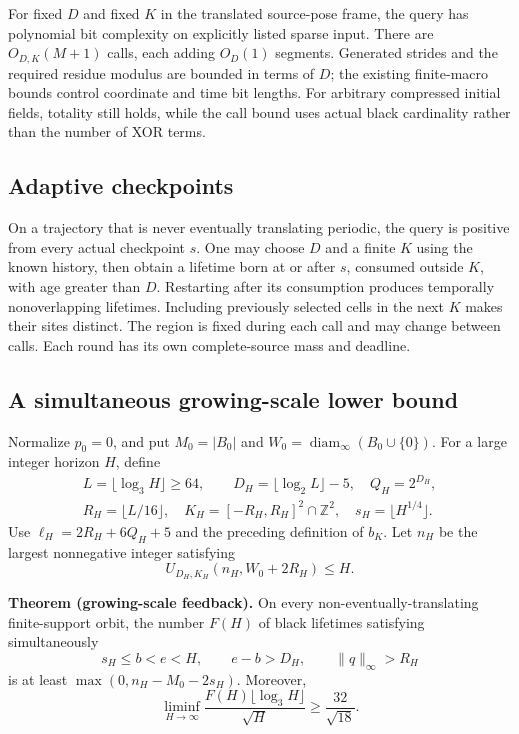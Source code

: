 For fixed \(D\) and fixed \(K\) in the translated source-pose frame, the
query has polynomial bit complexity on explicitly listed sparse input.
There are \(O_{D,K}(M+1)\) calls, each adding \(O_D(1)\) segments. Generated
strides and the required residue modulus are bounded in terms of \(D\);
the existing finite-macro bounds control coordinate and time bit lengths.
For arbitrary compressed initial fields, totality still holds, while the
call bound uses actual black cardinality rather than the number of XOR terms.

\subsection{Adaptive checkpoints}
On a trajectory that is never eventually translating periodic, the query
is positive from every actual checkpoint \(s\). One may choose \(D\) and a
finite \(K\) using the known history, then obtain a lifetime born at or after
\(s\), consumed outside \(K\), with age greater than \(D\). Restarting after
its consumption produces temporally nonoverlapping lifetimes. Including
previously selected cells in the next \(K\) makes their sites distinct.
The region is fixed during each call and may change between calls. Each
round has its own complete-source mass and deadline.

\subsection{A simultaneous growing-scale lower bound}
Normalize \(p_0=0\), and put \(M_0=|B_0|\) and
\(W_0=\operatorname{diam}_\infty(B_0\cup\{0\})\). For a large integer
horizon \(H\), define
\[
\begin{gathered}
 L=\lfloor\log_3 H\rfloor\ge64,\qquad
 D_H=\lfloor\log_2 L\rfloor-5,\quad Q_H=2^{D_H},\\
 R_H=\lfloor L/16\rfloor,\quad
 K_H=[-R_H,R_H]^2\cap\mathbb Z^2,\quad
 s_H=\lfloor H^{1/4}\rfloor.
\end{gathered}
\]
Use \(\ell_H=2R_H+6Q_H+5\) and the preceding definition of \(b_K\).
Let \(n_H\) be the largest nonnegative integer satisfying
\[
 U_{D_H,K_H}(n_H,W_0+2R_H)\le H.
\]

\textbf{Theorem (growing-scale feedback).}
On every non-eventually-translating finite-support orbit, the number
\(F(H)\) of black lifetimes satisfying simultaneously
\[
 s_H\le b<e<H,\qquad e-b>D_H,\qquad \|q\|_\infty>R_H
\]
is at least \(\max(0,n_H-M_0-2s_H)\). Moreover,
\[
 \liminf_{H\to\infty}
 \frac{F(H)\lfloor\log_3H\rfloor}{\sqrt H}
 \ge \frac{32}{\sqrt{18}}.
\]


